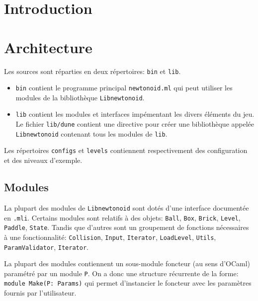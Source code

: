 \documentclass[french]{template}
\begin{document}

\fairemarges
\fairepagedegarde
\tabledematieres

\section{Introduction}

\section{Architecture}

Les sources sont réparties en deux répertoires: \texttt{bin} et \texttt{lib}.

\begin{itemize}
    \item \texttt{bin} contient le programme principal \texttt{newtonoid.ml} qui peut utiliser les modules de la bibliothèque \texttt{Libnewtonoid}.
    \item \texttt{lib} contient les modules et interfaces impémentant les divers éléments du jeu. Le fichier \texttt{lib/dune} contient une directive pour créer une bibliothèque appelée \texttt{Libnewtonoid} contenant tous les modules de \texttt{lib}.
\end{itemize}

Les répertoires \texttt{configs} et \texttt{levels} contiennent respectivement des configuration et des niveaux d'exemple.

\subsection{Modules}

La plupart des modules de \texttt{Libnewtonoid} sont dotés d'une interface documentée en \texttt{.mli}. Certains modules sont relatifs à des objets: \texttt{Ball}, \texttt{Box}, \texttt{Brick}, \texttt{Level}, \texttt{Paddle}, \texttt{State}. Tandis que d'autres sont un groupement de fonctions nécessaires à une fonctionnalité: \texttt{Collision}, \texttt{Input}, \texttt{Iterator}, \texttt{LoadLevel}, \texttt{Utils}, \texttt{ParamValidator}, \texttt{Iterator}.

La plupart des modules contiennent un sous-module foncteur (au sens d'OCaml) paramétré par un module \texttt{P}. On a donc une structure récurrente de la forme: \texttt{module Make(P: Params)} qui permet d'instancier le foncteur avec les paramètres fournis par l'utilisateur.
\end{document}
